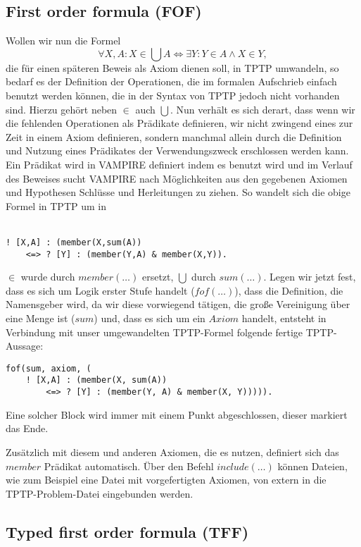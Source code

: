 \documentclass{article}
\begin{document}
\subsection{First order formula (FOF)}
\label{subsec:tptpfof}
Wollen wir nun die Formel 
\[\forall X,A : X \in \bigcup A \Leftrightarrow \exists Y : Y \in A \land X \in Y,\]
die für einen späteren Beweis als Axiom dienen soll, in TPTP umwandeln, 
so bedarf es der Definition der Operationen, die im formalen Aufschrieb einfach benutzt werden können, 
die in der Syntax von TPTP jedoch nicht vorhanden sind.
Hierzu gehört neben $\in$ auch  $\bigcup$. 
Nun verhält es sich derart, dass wenn wir die fehlenden Operationen als Prädikate definieren, 
wir nicht zwingend eines zur Zeit in einem Axiom definieren, sondern manchmal allein durch die Definition und Nutzung eines Prädikates der Verwendungszweck erschlossen werden kann.
Ein Prädikat wird in VAMPIRE definiert indem es benutzt wird und im Verlauf des Beweises sucht VAMPIRE nach Möglichkeiten aus den gegebenen Axiomen und Hypothesen Schlüsse und Herleitungen zu ziehen.
So wandelt sich die obige Formel in TPTP um in \\ \\
\begin{lstlisting}[language=tptp]
! [X,A] : (member(X,sum(A))
	<=> ? [Y] : (member(Y,A) & member(X,Y)).
\end{lstlisting}
$\in$ wurde durch $member(\dots)$ ersetzt, $\bigcup$ durch $sum(\dots)$.
Legen wir jetzt fest, dass es sich um Logik erster Stufe handelt ($fof(\dots)$), dass die Definition, die Namensgeber wird, da wir diese vorwiegend tätigen, die große Vereinigung über eine Menge ist ($sum$) und, dass es sich um ein $Axiom$ handelt,
entsteht in Verbindung mit unser umgewandelten TPTP-Formel folgende fertige TPTP-Aussage:
\begin{lstlisting}[language=tptp]
fof(sum, axiom, (	
	! [X,A] : (member(X, sum(A)) 
		<=> ? [Y] : (member(Y, A) & member(X, Y))))).
\end{lstlisting}

Eine solcher Block wird immer mit einem Punkt abgeschlossen, dieser markiert das Ende.

Zusätzlich mit diesem und anderen Axiomen, die es nutzen, definiert sich das $member$ Prädikat automatisch.
Über den Befehl $include(\dots)$ können Dateien, wie zum Beispiel eine Datei mit vorgefertigten Axiomen, von extern in die TPTP-Problem-Datei eingebunden werden.

\subsection{Typed first order formula (TFF)}
\label{subsec:tptptff}
\end{document}
